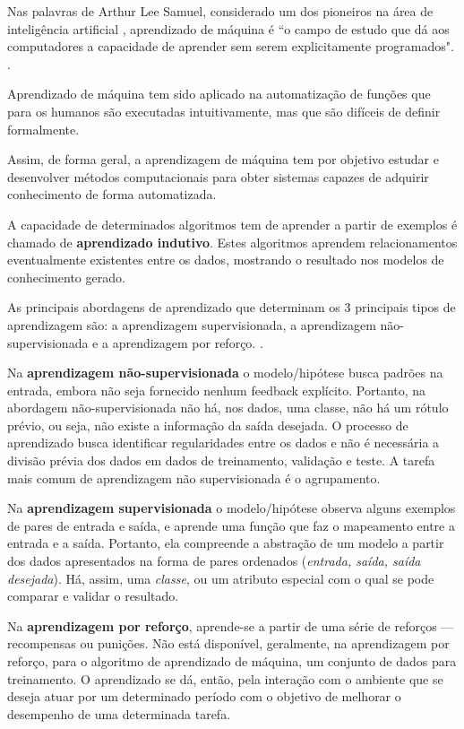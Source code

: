Nas palavras de Arthur Lee Samuel, considerado um dos pioneiros na área de inteligência artificial \cite{wiederhold_arthur_1992}, aprendizado de máquina é ``o campo de estudo que dá aos computadores a capacidade de aprender sem serem explicitamente programados". \cite[p. 89]{simon_too_2013}.

Aprendizado de máquina tem sido aplicado na automatização de funções que para os humanos são executadas intuitivamente, mas que são difíceis de definir formalmente. \cite{sarkar_2017}

Assim, de forma geral, a aprendizagem de máquina tem por objetivo estudar e desenvolver métodos computacionais para obter sistemas capazes de adquirir conhecimento de forma automatizada. \cite{lima_ia_2016}

A capacidade de determinados algoritmos tem de aprender a partir de exemplos é chamado de \textbf{aprendizado indutivo}. Estes algoritmos aprendem relacionamentos eventualmente existentes entre os dados, mostrando o resultado nos modelos de conhecimento gerado. \cite{goldschmidt2005}\cite{alpaydin_introduction_2014}

As principais abordagens de aprendizado que determinam os 3 principais tipos de aprendizagem são: a aprendizagem supervisionada, a aprendizagem não-supervisionada e a aprendizagem por reforço. \cite{Norvig2013}. 

Na \textbf{aprendizagem não-supervisionada} o modelo/hipótese busca padrões na entrada, embora não seja fornecido nenhum feedback explícito. Portanto, na abordagem não-supervisionada não há, nos dados, uma classe, não há um rótulo prévio, ou seja, não existe a informação da saída desejada. O processo de aprendizado busca identificar regularidades entre os dados e não é necessária a divisão prévia dos dados em dados de treinamento, validação e teste.  A tarefa mais comum de aprendizagem não supervisionada é o agrupamento. \cite{Norvig2013} \cite{Boscarioli2017} \cite{goldschmidt2005} \cite{aprenda_mineracao_fernando_amaral16}

Na \textbf{aprendizagem supervisionada} o modelo/hipótese observa alguns exemplos de pares de entrada e saída, e aprende uma função que faz o mapeamento entre a entrada e a saída. Portanto, ela compreende a abstração de um modelo a partir dos dados apresentados na forma de pares ordenados (\textit{entrada, saída, saída desejada}). Há, assim, uma \textit{classe}, ou um atributo especial com o qual se pode comparar e validar o resultado.

Na \textbf{aprendizagem por reforço}, aprende-se a partir de uma série de reforços --- recompensas ou punições. Não está disponível, geralmente, na aprendizagem por reforço, para o algoritmo de aprendizado de máquina, um conjunto de dados para treinamento. O aprendizado se dá, então, pela interação com o ambiente que se deseja atuar por um determinado período com o objetivo de melhorar o desempenho de uma determinada tarefa. \cite{Norvig2013} \cite{aprenda_mineracao_fernando_amaral16} \cite{silva_restaurante_2019}	


